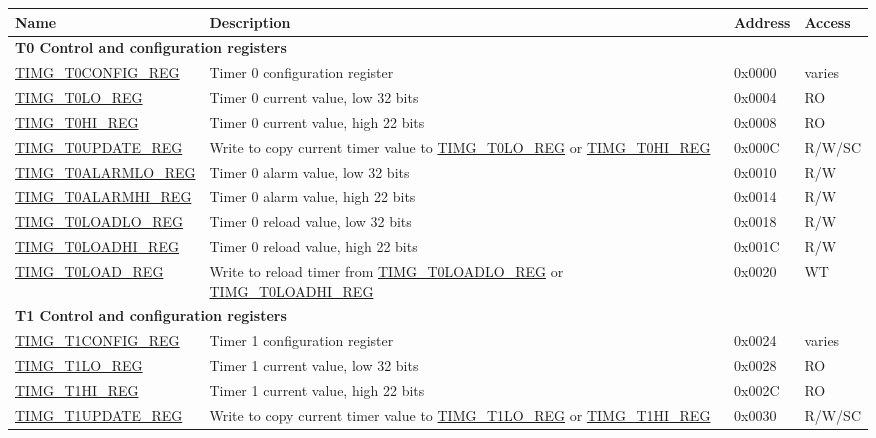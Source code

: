 
\begin{longtable}{ | p{5.5cm} | p{7.5cm} | p{1.3cm} | p{1cm} | }
\hline\rowcolor{lightgray}
Name & Description &  Address & Access \\ \hline
\endhead
\multicolumn{4}{|l|}{\textbf{T0 Control and configuration registers}} \\ \hline
\hyperref[regdesc:TIMGTXCONFIGREG]{TIMG\_T0CONFIG\_REG} & Timer 0 configuration register & 0x0000 & varies \\ \hline
\hyperref[regdesc:TIMGTXLOREG]{TIMG\_T0LO\_REG} & Timer 0 current value, low 32 bits & 0x0004 & RO \\ \hline
\hyperref[regdesc:TIMGTXHIREG]{TIMG\_T0HI\_REG} & Timer 0 current value, high 22 bits & 0x0008 & RO \\ \hline
\hyperref[regdesc:TIMGTXUPDATEREG]{TIMG\_T0UPDATE\_REG} & Write to copy current timer value to \hyperref[regdesc:TIMGTXLOREG]{TIMG\_T0LO\_REG} or \hyperref[regdesc:TIMGTXHIREG]{TIMG\_T0HI\_REG} & 0x000C & R/W/SC \\ \hline
\hyperref[regdesc:TIMGTXALARMLOREG]{TIMG\_T0ALARMLO\_REG} & Timer 0 alarm value, low 32 bits & 0x0010 & R/W \\ \hline
\hyperref[regdesc:TIMGTXALARMHIREG]{TIMG\_T0ALARMHI\_REG} & Timer 0 alarm value, high 22 bits & 0x0014 & R/W \\ \hline
\hyperref[regdesc:TIMGTXLOADLOREG]{TIMG\_T0LOADLO\_REG} & Timer 0 reload value, low 32 bits & 0x0018 & R/W \\ \hline
\hyperref[regdesc:TIMGTXLOADHIREG]{TIMG\_T0LOADHI\_REG} & Timer 0 reload value, high 22 bits & 0x001C & R/W \\ \hline
\hyperref[regdesc:TIMGTXLOADREG]{TIMG\_T0LOAD\_REG} & Write to reload timer from \hyperref[regdesc:TIMGTXLOADLOREG]{TIMG\_T0LOADLO\_REG} or \hyperref[regdesc:TIMGTXLOADHIREG]{TIMG\_T0LOADHI\_REG} & 0x0020 & WT \\ \hline
\multicolumn{4}{|l|}{\textbf{T1 Control and configuration registers}} \\ \hline
\hyperref[regdesc:TIMGTXCONFIGREG]{TIMG\_T1CONFIG\_REG} & Timer 1 configuration register & 0x0024 & varies \\ \hline
\hyperref[regdesc:TIMGTXLOREG]{TIMG\_T1LO\_REG} & Timer 1 current value, low 32 bits & 0x0028 & RO \\ \hline
\hyperref[regdesc:TIMGTXHIREG]{TIMG\_T1HI\_REG} & Timer 1 current value, high 22 bits & 0x002C & RO \\ \hline
\hyperref[regdesc:TIMGTXUPDATEREG]{TIMG\_T1UPDATE\_REG} & Write to copy current timer value to \hyperref[regdesc:TIMGTXLOREG]{TIMG\_T1LO\_REG} or \hyperref[regdesc:TIMGTXHIREG]{TIMG\_T1HI\_REG} & 0x0030 & R/W/SC \\ \hline

\end{longtable}
